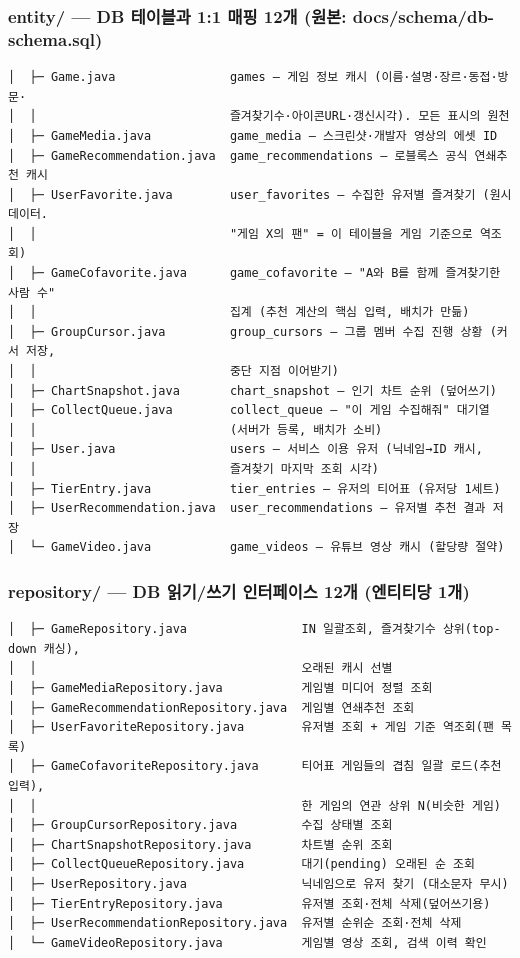 \documentclass[11pt]{article}
\begin{document}
\subsubsection*{entity/ --- DB 테이블과 1:1 매핑 12개 (원본: docs/schema/db-schema.sql)}
\begin{Verbatim}[frame=single, fontsize=\small]
│  ├─ Game.java                games — 게임 정보 캐시 (이름·설명·장르·동접·방문·
│  │                           즐겨찾기수·아이콘URL·갱신시각). 모든 표시의 원천
│  ├─ GameMedia.java           game_media — 스크린샷·개발자 영상의 에셋 ID
│  ├─ GameRecommendation.java  game_recommendations — 로블록스 공식 연쇄추천 캐시
│  ├─ UserFavorite.java        user_favorites — 수집한 유저별 즐겨찾기 (원시 데이터.
│  │                           "게임 X의 팬" = 이 테이블을 게임 기준으로 역조회)
│  ├─ GameCofavorite.java      game_cofavorite — "A와 B를 함께 즐겨찾기한 사람 수"
│  │                           집계 (추천 계산의 핵심 입력, 배치가 만듦)
│  ├─ GroupCursor.java         group_cursors — 그룹 멤버 수집 진행 상황 (커서 저장,
│  │                           중단 지점 이어받기)
│  ├─ ChartSnapshot.java       chart_snapshot — 인기 차트 순위 (덮어쓰기)
│  ├─ CollectQueue.java        collect_queue — "이 게임 수집해줘" 대기열
│  │                           (서버가 등록, 배치가 소비)
│  ├─ User.java                users — 서비스 이용 유저 (닉네임→ID 캐시,
│  │                           즐겨찾기 마지막 조회 시각)
│  ├─ TierEntry.java           tier_entries — 유저의 티어표 (유저당 1세트)
│  ├─ UserRecommendation.java  user_recommendations — 유저별 추천 결과 저장
│  └─ GameVideo.java           game_videos — 유튜브 영상 캐시 (할당량 절약)
\end{Verbatim}

\subsubsection*{repository/ --- DB 읽기/쓰기 인터페이스 12개 (엔티티당 1개)}
\begin{Verbatim}[frame=single, fontsize=\small]
│  ├─ GameRepository.java                IN 일괄조회, 즐겨찾기수 상위(top-down 캐싱),
│  │                                     오래된 캐시 선별
│  ├─ GameMediaRepository.java           게임별 미디어 정렬 조회
│  ├─ GameRecommendationRepository.java  게임별 연쇄추천 조회
│  ├─ UserFavoriteRepository.java        유저별 조회 + 게임 기준 역조회(팬 목록)
│  ├─ GameCofavoriteRepository.java      티어표 게임들의 겹침 일괄 로드(추천 입력),
│  │                                     한 게임의 연관 상위 N(비슷한 게임)
│  ├─ GroupCursorRepository.java         수집 상태별 조회
│  ├─ ChartSnapshotRepository.java       차트별 순위 조회
│  ├─ CollectQueueRepository.java        대기(pending) 오래된 순 조회
│  ├─ UserRepository.java                닉네임으로 유저 찾기 (대소문자 무시)
│  ├─ TierEntryRepository.java           유저별 조회·전체 삭제(덮어쓰기용)
│  ├─ UserRecommendationRepository.java  유저별 순위순 조회·전체 삭제
│  └─ GameVideoRepository.java           게임별 영상 조회, 검색 이력 확인
\end{Verbatim}
\end{document}
